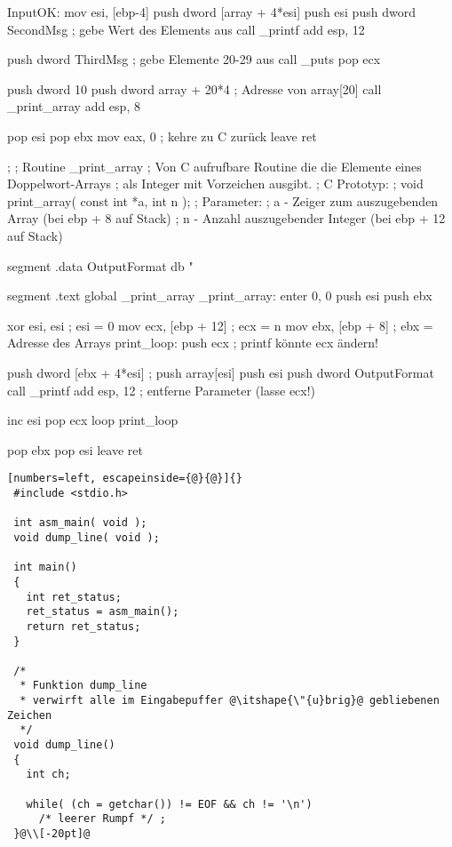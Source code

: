 \begin{AsmCodeListing}[label=array1.asm, numbers=left, commandchars=\\\{\}]
 InputOK:
         mov     esi, [ebp-4]
         push    dword [array + 4*esi]
         push    esi
         push    dword SecondMsg        ; gebe Wert des Elements aus
         call    _printf
         add     esp, 12

         push    dword ThirdMsg         ; gebe Elemente 20-29 aus
         call    _puts
         pop     ecx

         push    dword 10
         push    dword array + 20*4     ; Adresse von array[20]
         call    _print_array
         add     esp, 8

         pop     esi
         pop     ebx
         mov     eax, 0                 ; kehre zu C zur\"{u}ck
         leave
         ret

 ;
 ; Routine _print_array
 ; Von C aufrufbare Routine die die Elemente eines Doppelwort-Arrays
 ; als Integer mit Vorzeichen ausgibt.
 ; C Prototyp:
 ; void print_array( const int *a, int n );
 ; Parameter:
 ;   a - Zeiger zum auszugebenden Array (bei ebp + 8 auf Stack)
 ;   n - Anzahl auszugebender Integer (bei ebp + 12 auf Stack)

 segment .data
 OutputFormat    db   "%

 segment .text
         global  _print_array
 _print_array:
         enter   0, 0
         push    esi
         push    ebx

         xor     esi, esi               ; esi = 0
         mov     ecx, [ebp + 12]        ; ecx = n
         mov     ebx, [ebp + 8]         ; ebx = Adresse des Arrays
 print_loop:
         push    ecx                    ; printf k\"{o}nnte ecx \"{a}ndern!

         push    dword [ebx + 4*esi]    ; push array[esi]
         push    esi
         push    dword OutputFormat
         call    _printf
         add     esp, 12                ; entferne Parameter (lasse ecx!)

         inc     esi
         pop     ecx
         loop    print_loop

         pop     ebx
         pop     esi
         leave
         ret
\end{AsmCodeListing}

\begin{lstlisting}[numbers=left, escapeinside={@}{@}]{}
 #include <stdio.h>

 int asm_main( void );
 void dump_line( void );

 int main()
 {
   int ret_status;
   ret_status = asm_main();
   return ret_status;
 }

 /*
  * Funktion dump_line
  * verwirft alle im Eingabepuffer @\itshape{\"{u}brig}@ gebliebenen Zeichen
  */
 void dump_line()
 {
   int ch;

   while( (ch = getchar()) != EOF && ch != '\n')
     /* leerer Rumpf */ ;
 }@\\[-20pt]@
\end{lstlisting}

